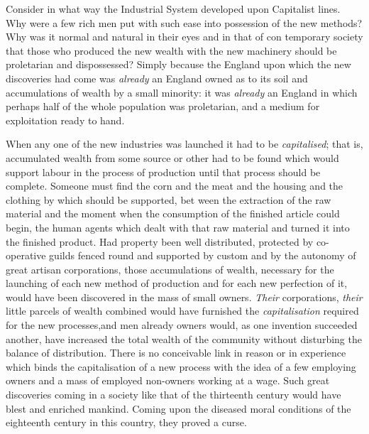 \documentclass{book}
\begin{document}
Consider in what way the Industrial System developed upon Capitalist lines. Why were a few rich men put with such ease into possession of the new methods? Why was it normal and natural in their eyes and in that of con temporary society that those who produced the new wealth with the new machinery should be proletarian and dispossessed? Simply because the England upon which the new discoveries had come was \emph{already} an England owned as to its soil and accumulations of wealth by a small minority: it was \emph{already} an England in which perhaps half of the whole population was proletarian, and a medium for exploitation ready to hand.

When any one of the new industries was launched it had to be \emph{capitalised}; that is, accumulated wealth from some source or other had to be found which would support labour in the process of production until that process should be complete. Someone must find the corn and the meat and the housing and the clothing by which should be supported, bet ween the extraction of the raw material and the moment when the consumption of the finished article could begin, the human agents which dealt with that raw material and turned it into the finished product. Had property been well distributed, protected by co-operative guilds fenced round and supported by custom and by the autonomy of great artisan corporations, those accumulations of wealth, necessary for the launching of each new method of production and for each new perfection of it, would have been discovered in the mass of small owners. \emph{Their} corporations, \emph{their} little parcels of wealth combined would have furnished the \emph{capitalisation} required for the new processes,and men already owners would, as one invention succeeded another, have increased the total wealth of the community without disturbing the balance of distribution. There is no conceivable link in reason or in experience which binds the capitalisation of a new process with the idea of a few employing owners and a mass of employed non-owners working at a wage. Such great discoveries coming in a society like that of the thirteenth century would have blest and enriched mankind. Coming upon the diseased moral conditions of the eighteenth century in this country, they proved a curse.
\end{document}
